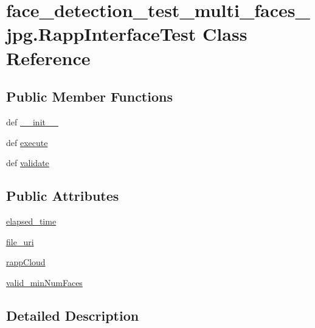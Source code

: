 \hypertarget{classface__detection__test__multi__faces__jpg_1_1RappInterfaceTest}{\section{face\-\_\-detection\-\_\-test\-\_\-multi\-\_\-faces\-\_\-jpg.\-Rapp\-Interface\-Test Class Reference}
\label{classface__detection__test__multi__faces__jpg_1_1RappInterfaceTest}
}
\subsection*{Public Member Functions}
\begin{DoxyCompactItemize}
\item 
def \hyperlink{classface__detection__test__multi__faces__jpg_1_1RappInterfaceTest_acd3a84ef271d5356b6faa4ff52eccb3b}{\-\_\-\-\_\-init\-\_\-\-\_\-}
\item 
def \hyperlink{classface__detection__test__multi__faces__jpg_1_1RappInterfaceTest_a16cf99a12f3b48f19088eff7ff20d8b7}{execute}
\item 
def \hyperlink{classface__detection__test__multi__faces__jpg_1_1RappInterfaceTest_aeedb5c8a837c891174a96a129c699a93}{validate}
\end{DoxyCompactItemize}
\subsection*{Public Attributes}
\begin{DoxyCompactItemize}
\item 
\hyperlink{classface__detection__test__multi__faces__jpg_1_1RappInterfaceTest_a755573e6cf7b28a4e6fbd18c40260db0}{elapsed\-\_\-time}
\item 
\hyperlink{classface__detection__test__multi__faces__jpg_1_1RappInterfaceTest_a8061b8d77167a61713c2d12b189f44a8}{file\-\_\-uri}
\item 
\hyperlink{classface__detection__test__multi__faces__jpg_1_1RappInterfaceTest_a106c9ae6e2182f7409d1d8304b626fca}{rapp\-Cloud}
\item 
\hyperlink{classface__detection__test__multi__faces__jpg_1_1RappInterfaceTest_ade517736c2fe865e851aa6b771ba351b}{valid\-\_\-min\-Num\-Faces}
\end{DoxyCompactItemize}


\subsection{Detailed Description}


